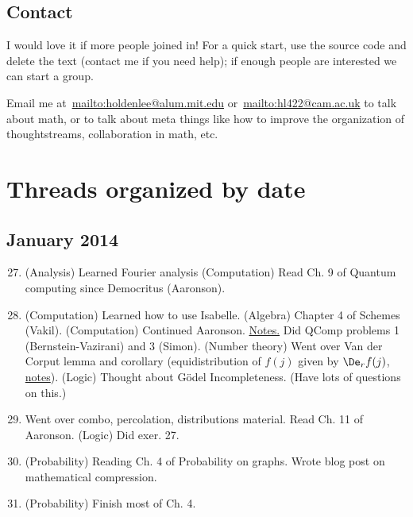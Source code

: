 \section{Contact}

I would love it if more people joined in! For a quick start, use the source code and delete the text (contact me if you need help); if enough people are interested we can start a group.

Email me at~\url{mailto:holdenlee@alum.mit.edu} or~\url{mailto:hl422@cam.ac.uk} to talk about math, or to talk about meta things like how to improve the organization of thoughtstreams, collaboration in math, etc.
 

\chapter{Threads organized by date}

\section{January 2014}
\begin{enumerate}
\setcounter{enumi}{26}
\item %
(Analysis) Learned Fourier analysis
(Computation) Read Ch. 9 of Quantum computing since Democritus (Aaronson).
\item %
(Computation) Learned how to use Isabelle.
(Algebra) Chapter 4 of Schemes (Vakil).
(Computation) Continued Aaronson.
\hyperlink{comp/qc/1-28-14}{Notes.} Did QComp problems 1 (Bernstein-Vazirani) and 3 (Simon).
(Number theory) Went over Van der Corput lemma and corollary (equidistribution of $f(j)$ given by $\De_r f(j)$, \hyperlink{nt/ac/weyl-equid}{notes}).
(Logic) Thought about G\"odel Incompleteness. (Have lots of questions on this.)
\item Went over combo, percolation, distributions material. Read Ch. 11 of Aaronson. (Logic) Did exer. 27.
\item (Probability) Reading Ch. 4 of Probability on graphs. 
Wrote blog post on mathematical compression.
\item (Probability) Finish most of Ch. 4.
\end{enumerate}


